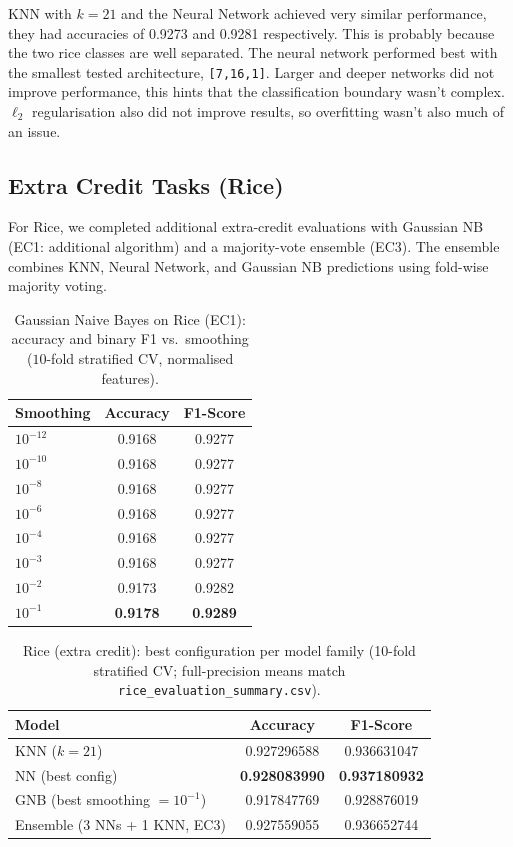 \documentclass[11pt,letterpaper]{article}
\begin{document}
KNN with $k=21$ and the Neural Network achieved very similar performance, they had accuracies of 0.9273 and 0.9281 respectively. This is probably because the two rice classes are well separated. The neural
network performed best with the smallest tested architecture,
\texttt{[7,16,1]}. Larger and deeper networks did not improve performance, this hints that the classification boundary wasn't complex.
$\ell_2$ regularisation also did not improve results, so overfitting wasn't also much of an issue.

\subsection{Extra Credit Tasks (Rice)}

For Rice, we completed additional extra-credit evaluations with Gaussian NB
(EC1: additional algorithm) and a majority-vote ensemble (EC3). The ensemble
combines KNN, Neural Network, and Gaussian NB predictions using fold-wise
majority voting.

\begin{table}[H]
\centering
\caption{Gaussian Naive Bayes on Rice (EC1): accuracy and binary F1 vs.\ smoothing
  ($10$-fold stratified CV, normalised features).}
\label{tab:d3_gnb}
\begin{tabular}{@{}lcc@{}}
\toprule
Smoothing & Accuracy & F1-Score \\
\midrule
$10^{-12}$ & 0.9168 & 0.9277 \\
$10^{-10}$ & 0.9168 & 0.9277 \\
$10^{-8}$  & 0.9168 & 0.9277 \\
$10^{-6}$  & 0.9168 & 0.9277 \\
$10^{-4}$  & 0.9168 & 0.9277 \\
$10^{-3}$  & 0.9168 & 0.9277 \\
$10^{-2}$  & 0.9173 & 0.9282 \\
\rowcolor{hilight}
\textbf{$10^{-1}$} & \textbf{0.9178} & \textbf{0.9289} \\
\bottomrule
\end{tabular}
\end{table}

\begin{table}[H]
\centering
\caption{Rice (extra credit): best configuration per model family (10-fold stratified CV;
         full-precision means match \texttt{rice\_evaluation\_summary.csv}).}
\label{tab:d3_ec}
\begin{tabular}{@{}lcc@{}}
\toprule
Model & Accuracy & F1-Score \\
\midrule
KNN ($k=21$) & 0.927296588 & 0.936631047 \\
\rowcolor{hilight}
NN (best config) & \textbf{0.928083990} & \textbf{0.937180932} \\
GNB (best smoothing $=10^{-1}$) & 0.917847769 & 0.928876019 \\
Ensemble (3 NNs + 1 KNN, EC3) & 0.927559055 & 0.936652744 \\
\bottomrule
\end{tabular}
\end{table}
\end{document}
